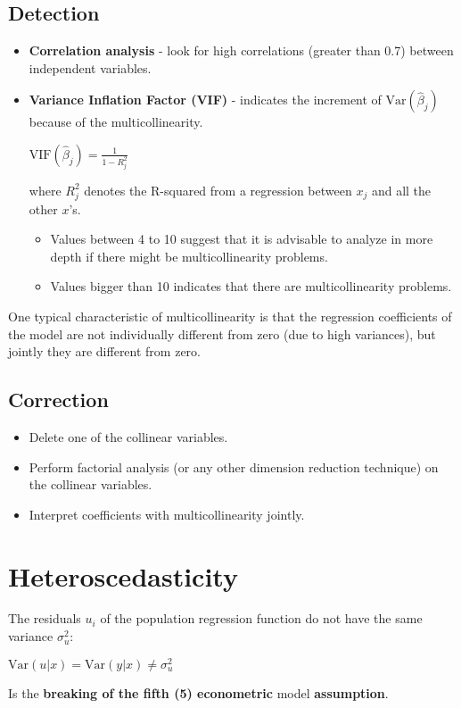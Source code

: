 \documentclass[10pt, a4paper, landscape]{extarticle}
\newcommand{\Var}{\mathrm{Var}}
\begin{document}
\begin{multicols}{3}
	\subsection*{Detection}
		\begin{itemize}[leftmargin=*]
			\item \textbf{Correlation analysis} - look for high correlations (greater than 0.7) between independent variables.
			\item \textbf{Variance Inflation Factor (VIF)} - indicates the increment of $\Var(\hat{\beta}_j)$ because of the multicollinearity.
			\begin{center}
				$\mathrm{VIF} (\hat{\beta}_j) = \frac{1}{1-R_j^2}$
			\end{center}
			where $R^2_j$ denotes the R-squared from a regression between $x_j$ and all the other $x$'s. 
			\begin{itemize}[leftmargin=*]
				\item Values between 4 to 10 suggest that it is advisable to analyze in more depth if there might be multicollinearity problems.
				\item Values bigger than 10 indicates that there are multicollinearity problems.
			\end{itemize}
		\end{itemize}
		One typical characteristic of multicollinearity is that the regression coefficients of the model are not individually different from zero (due to high variances), but jointly they are different from zero.
	\subsection*{Correction}
		\begin{itemize}[leftmargin=*]
			\item Delete one of the collinear variables.
			\item Perform factorial analysis (or any other dimension reduction technique) on the collinear variables.
			\item Interpret coefficients with multicollinearity jointly.
		\end{itemize}
\columnbreak
\section*{Heteroscedasticity}
	The residuals $u_i$ of the population regression function do not have the same variance $\sigma^2_u$:
	\begin{center}
		$\Var(u|x) = \Var(y|x) \neq \sigma^2_u$
	\end{center}
	Is the \textbf{breaking of the fifth (5) econometric} model \textbf{assumption}.

\end{multicols}
\end{document}
